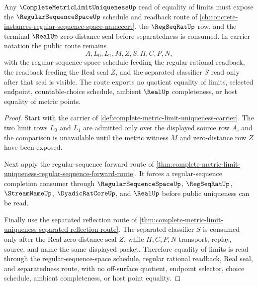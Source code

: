 \begin{theorem}
\label{thm:complete-metric-limit-uniqueness-regular-sequence-space-route}
Any $\CompleteMetricLimitUniquenessUp$ read of equality of limits must expose the $\RegularSequenceSpaceUp$ schedule and readback route of \autoref{ch:concrete-instances-regular-sequence-space-namecert}, the $\RegSeqRatUp$ row, and the terminal $\RealUp$ zero-distance seal before separatedness is consumed. In carrier notation the public route remains
$$
A,L_{0},L_{1},M,Z,S,H,C,P,N,
$$
with the regular-sequence-space schedule feeding the regular rational readback, the readback feeding the Real seal $Z$, and the separated classifier $S$ read only after that seal is visible. The route exports no quotient equality of limits, selected endpoint, countable-choice schedule, ambient $\RealUp$ completeness, or host equality of metric points.
\end{theorem}
\begin{proof}
Start with the carrier of \autoref{def:complete-metric-limit-uniqueness-carrier}. The two limit rows $L_{0}$ and $L_{1}$ are admitted only over the displayed source row $A$, and the comparison is unavailable until the metric witness $M$ and zero-distance row $Z$ have been exposed.

Next apply the regular-sequence forward route of \autoref{thm:complete-metric-limit-uniqueness-regular-sequence-forward-route}. It forces a regular-sequence completion consumer through $\RegularSequenceSpaceUp$, $\RegSeqRatUp$, $\StreamNameUp$, $\DyadicRatCoreUp$, and $\RealUp$ before public uniqueness can be read.

Finally use the separated reflection route of \autoref{thm:complete-metric-limit-uniqueness-separated-reflection-route}. The separated classifier $S$ is consumed only after the Real zero-distance seal $Z$, while $H,C,P,N$ transport, replay, source, and name the same displayed packet. Therefore equality of limits is read through the regular-sequence-space schedule, regular rational readback, Real seal, and separatedness route, with no off-surface quotient, endpoint selector, choice schedule, ambient completeness, or host point equality.
\end{proof}
